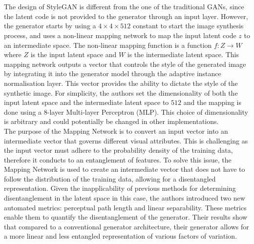 \\ \\
The design of StyleGAN is different from the one of the traditional GANs, since the latent code is not provided to the generator through an input layer. However, the generator starts by using a $4\times4\times512$ constant to start the image synthesis process, and uses a non-linear mapping network to map the input latent code $z$ to an intermediate space. The non-linear mapping function is a function $f:Z\rightarrow W$ where $Z$ is the input latent space and $W$ is the intermediate latent space. This mapping network outputs a vector that controls the style of the generated image by integrating it into the generator model through the adaptive instance normalisation layer. This vector provides the ability to dictate the style of the synthetic image.
For simplicity, the authors set the dimensionality of both the input latent space and the intermediate latent space to $512$ and the mapping is done using a $8$-layer Multi-layer Perceptron (MLP). This choice of dimensionality is arbitrary and could potentially be changed in other implementations.\\
The purpose of the Mapping Network is to convert an input vector into an intermediate vector that governs different visual attributes. This is challenging as the input vector must adhere to the probability density of the training data, therefore it conducts to an entanglement of features. To solve this issue, the Mapping Network is used to create an intermediate vector that does not have to follow the distribution of the training data, allowing for a disentangled representation. Given the inapplicability of previous methods for determining disentanglement in the latent space in this case, the authors introduced two new automated metrics: perceptual path length and linear separability. These metrics enable them to quantify the disentanglement of the generator. Their results show that compared to a conventional generator architecture, their generator allows for a more linear and less entangled representation of various factors of variation.\\ \\
